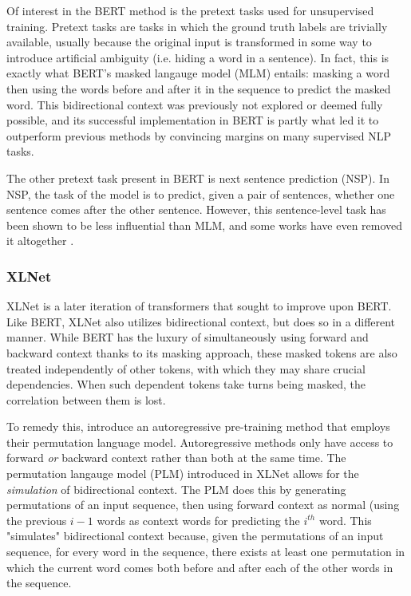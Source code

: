 \documentclass[11pt,a4paper]{article}
\begin{document}
Of interest in the BERT method is the pretext tasks used for unsupervised training. Pretext tasks are tasks in which the ground truth labels are trivially available, usually because the original input is transformed in some way to introduce artificial ambiguity (i.e. hiding a word in a sentence). In fact, this is exactly what BERT's masked langauge model (MLM) entails: masking a word then using the words before and after it in the sequence to predict the masked word. This bidirectional context was previously not explored or deemed fully possible, and its successful implementation in BERT is partly what led it to outperform previous methods by convincing margins on many supervised NLP tasks.

The other pretext task present in BERT is next sentence prediction (NSP). In NSP, the task of the model is to predict, given a pair of sentences, whether one sentence comes after the other sentence. However, this sentence-level task has been shown to be less influential than MLM, and some works have even removed it altogether \cite{roberta}.

\subsubsection{XLNet}

XLNet \cite{xlnet} is a later iteration of transformers that sought to improve upon BERT. Like BERT, XLNet also utilizes bidirectional context, but does so in a different manner. While BERT has the luxury of simultaneously using forward and backward context thanks to its masking approach, these masked tokens are also treated independently of other tokens, with which they may share crucial dependencies. When such dependent tokens take turns being masked, the correlation between them is lost. 

To remedy this, \cite{xlnet} introduce an autoregressive pre-training method that employs their permutation language model. Autoregressive methods only have access to forward \emph{or} backward context rather than both at the same time. The permutation langauge model (PLM) introduced in XLNet allows for the \textit{simulation} of bidirectional context. The PLM does this by generating permutations of an input sequence, then using forward context as normal (using the previous $i-1$ words as context words for predicting the $i^{th}$ word. This "simulates" bidirectional context because, given the permutations of an input sequence, for every word in the sequence, there exists at least one permutation in which the current word comes both before and after each of the other words in the sequence.
\end{document}
